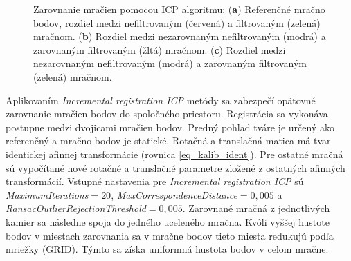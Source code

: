 \begin{figure}[h]
\begin{subfigure}[b]{0.32\textwidth}
		\caption{}
		\label{fig:icp:c}
	\end{subfigure}
	\caption{Zarovnanie mračien pomocou ICP algoritmu: (\textbf{a}) Referenčné mračno bodov, rozdiel medzi nefiltrovaným (červená) a filtrovaným (zelená) mračnom. (\textbf{b}) Rozdiel medzi nezarovnaným nefiltrovaným (modrá) a zarovnaným filtrovaným (žltá) mračnom. (\textbf{c}) Rozdiel medzi nezarovnaným nefiltrovaným (modrá) a zarovnaným filtrovaným (zelená) mračnom.}
	\label{fig:3dm}
\end{figure}

Aplikovaním \textit{Incremental registration ICP} metódy sa zabezpečí opätovné zarovnanie mračien bodov do spoločného priestoru. Registrácia sa vykonáva postupne medzi dvojicami mračien bodov. Predný pohľad tváre je určený ako referenčný a mračno bodov je statické. Rotačná a translačná matica má tvar identickej afinnej transformácie (rovnica \ref{eq_kalib_ident}). Pre ostatné mračná sú vypočítané nové rotačné a translačné parametre zložené z ostatných afinných transformácií. Vstupné nastavenia pre \textit{Incremental registration ICP} sú \textit{MaximumIterations}$=20$, \textit{MaxCorrespondenceDistance}$=0,005$ a \textit{RansacOutlierRejectionThreshold}$=0,005$. Zarovnané mračná z jednotlivých kamier sa následne spoja do jedného uceleného mračna. Kvôli vyššej hustote bodov v miestach zarovnania sa v mračne bodov tieto miesta redukujú podľa mriežky (GRID). Týmto sa získa uniformná hustota bodov v celom mračne. 
